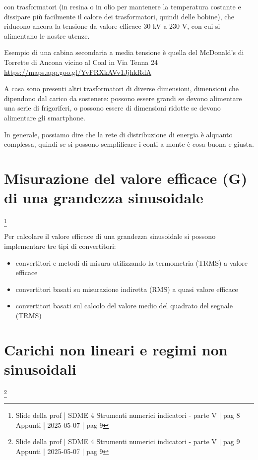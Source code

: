con trasformatori (in resina o in olio per mantenere la temperatura costante e dissipare più facilmente il calore dei trasformatori, quindi delle bobine), 
che riducono ancora la tensione da valore efficace 30 kV a 230 V, con cui si alimentano le nostre utenze. \newline 

\begin{tcolorbox}
    Esempio di una cabina secondaria a media tensione è quella del McDonald's di Torrette di Ancona vicino al Coal in Via Tenna 24\\
    \url{https://maps.app.goo.gl/YvFRXkAVv1JjhkRdA}
\end{tcolorbox}

A casa sono presenti altri trasformatori di diverse dimensioni, 
dimensioni che dipendono dal carico da sostenere: possono essere grandi se devono alimentare una serie di frigoriferi, o possono essere di dimensioni ridotte se devono alimentare gli smartphone. \newline 

In generale, possiamo dire che la rete di distribuzione di energia è alquanto complessa, quindi se si possono semplificare i conti a monte è cosa buona e giusta. \newline 

\newpage 

\section{Misurazione del valore efficace (G) di una grandezza sinusoidale}
\footnote{Slide della prof | SDME 4 Strumenti numerici indicatori - parte V | pag 8 \\  
Appunti | 2025-05-07 | pag 9}

Per calcolare il valore efficace di una grandezza sinusoidale si possono implementare tre tipi di convertitori: 

\begin{itemize}
    \item convertitori e metodi di misura utilizzando la termometria (TRMS) a valore efficace 
    \item convertitori basati su misurazione indiretta (RMS) a quasi valore efficace 
    \item convertitori basati sul calcolo del valore medio del quadrato del segnale (TRMS)
\end{itemize}

\newpage 

\section{Carichi non lineari e regimi non sinusoidali}
\footnote{Slide della prof | SDME 4 Strumenti numerici indicatori - parte V | pag 9\\  
Appunti | 2025-05-07 | pag 9}


